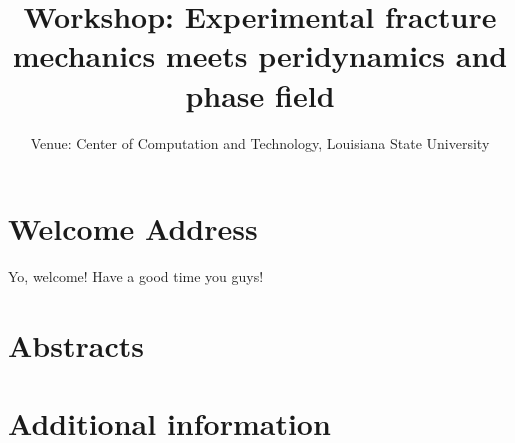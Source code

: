 \documentclass[12pt]{book}
\title{Workshop: Experimental fracture mechanics meets peridynamics and phase field}
\author{Venue: Center of Computation and Technology, Louisiana State University}
\newenvironment{conf-abstract}[4][]{
  \needspace{10\baselineskip}
  \begin{center}
    { \renewcommand\textsuperscript[1]{}
      \phantomsection\addcontentsline{toc}{section}
      {\texorpdfstring{#2 (\emph{#3})}{#2 (#3)}}
    }
    {{\large\bfseries #2}\marginnote{#1}\par}
    \medskip
    {#3\par}
    \smallskip
    {\small #4\par}
  \end{center}
}{%
  \bigskip
  \hrule
  \bigskip
}
\newcommand{\indexauthors}[1]{%
  \forcsvlist{\index}{#1}
}
\begin{document}
\frontmatter

\maketitle



\chapter{Welcome Address}

Yo, welcome! Have a good time you guys!


\begin{sidewaysfigure}

\end{sidewaysfigure}


\tableofcontents

\mainmatter
\chapter{Abstracts}




{
\begin{conf-abstract}[\datum\\\time]
{\title}
{\first \last}
{\affiliation}
\indexauthors{\last!\first}
\end{conf-abstract}
}




%

%
%
%

\chapter{Additional information}
\end{document}
